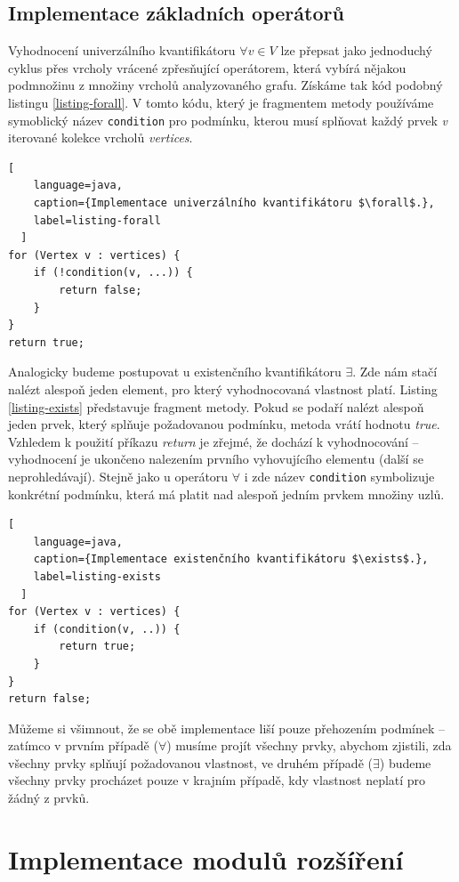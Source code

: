 \subsection{Implementace základních operátorů}
Vyhodnocení univerzálního kvantifikátoru $\forall v \in V$ lze přepsat jako jednoduchý cyklus přes vrcholy vrácené zpřesňující operátorem, která vybírá nějakou podmnožinu z množiny vrcholů analyzovaného grafu. Získáme tak kód podobný listingu \ref{listing-forall}. V tomto kódu, který je fragmentem metody používáme symoblický název \verb+condition+ pro podmínku, kterou musí splňovat každý prvek \emph{v} iterované kolekce vrcholů \emph{vertices}.

\begin{lstlisting}[
    language=java,
    caption={Implementace univerzálního kvantifikátoru $\forall$.},
    label=listing-forall
  ]
for (Vertex v : vertices) {
    if (!condition(v, ...)) {
        return false;
    }
}
return true;
\end{lstlisting}

Analogicky budeme postupovat u existenčního kvantifikátoru $\exists$. Zde nám stačí nalézt alespoň jeden element, pro který vyhodnocovaná vlastnost platí. Listing \ref{listing-exists} představuje fragment metody. Pokud se podaří nalézt alespoň jeden prvek, který splňuje požadovanou podmínku, metoda vrátí hodnotu \emph{true}. Vzhledem k použití příkazu \emph{return} je zřejmé, že dochází k  vyhodnocování -- vyhodnocení je ukončeno nalezením prvního vyhovujícího elementu (další se neprohledávají). Stejně jako u operátoru $\forall$ i zde název \verb+condition+ symbolizuje konkrétní podmínku, která má platit nad alespoň jedním prvkem množiny uzlů.

\begin{lstlisting}[
    language=java,
    caption={Implementace existenčního kvantifikátoru $\exists$.},
    label=listing-exists
  ]
for (Vertex v : vertices) {
    if (condition(v, ..)) {
        return true;
    }
}
return false;
\end{lstlisting}

Můžeme si všimnout, že se obě implementace liší pouze přehozením podmínek -- zatímco v prvním případě ($\forall$) musíme projít všechny prvky, abychom zjistili, zda všechny prvky splňují požadovanou vlastnost, ve druhém případě ($\exists$) budeme všechny prvky procházet pouze v krajním případě, kdy vlastnost neplatí pro žádný z prvků.

\section{Implementace modulů rozšíření}

